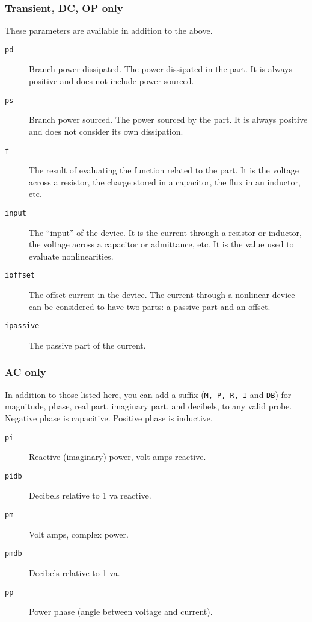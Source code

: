 \subsubsection{Transient, DC, OP only}

These parameters are available in addition to the above.

\begin{description}

\item[{\tt pd}] Branch power dissipated.  The power dissipated in the 
part.  It is always positive and does not include power sourced.

\item[{\tt ps}] Branch power sourced.  The power sourced by the part.  
It is always positive and does not consider its own dissipation.

\item[{\tt f}] The result of evaluating the function related to the 
part.  It is the voltage across a resistor, the charge stored in a 
capacitor, the flux in an inductor, etc.

\item[{\tt input}] The ``input'' of the device.  It is the current
through a resistor or inductor, the voltage across a capacitor or
admittance, etc.  It is the value used to evaluate nonlinearities.

\item[{\tt ioffset}] The offset current in the device.  The current
through a nonlinear device can be considered to have two parts: a
passive part and an offset.

\item[{\tt ipassive}] The passive part of the current.

\end{description}
\subsubsection{AC only}

In addition to those listed here, you can add a suffix ({\tt M, P, R,
I} and {\tt DB}) for magnitude, phase, real part, imaginary part, and
decibels, to any valid probe.  Negative phase is capacitive.  Positive
phase is inductive.

\begin{description}

\item[{\tt pi}] Reactive (imaginary) power, volt-amps reactive.

\item[{\tt pidb}] Decibels relative to 1 va reactive.

\item[{\tt pm}] Volt amps, complex power.

\item[{\tt pmdb}] Decibels relative to 1 va.

\item[{\tt pp}] Power phase (angle between voltage and current).

\end{description}
